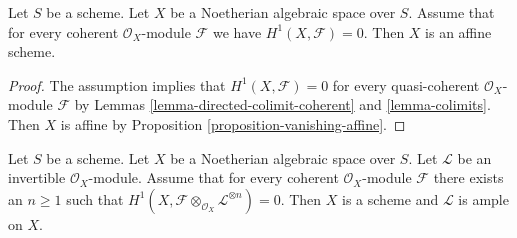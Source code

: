 \begin{lemma}
\label{lemma-Noetherian-h1-zero}
Let $S$ be a scheme. Let $X$ be a Noetherian algebraic space over $S$.
Assume that for every coherent $\mathcal{O}_X$-module
$\mathcal{F}$ we have $H^1(X, \mathcal{F}) = 0$.
Then $X$ is an affine scheme.
\end{lemma}

\begin{proof}
The assumption implies that $H^1(X, \mathcal{F}) = 0$ for every quasi-coherent
$\mathcal{O}_X$-module $\mathcal{F}$ by
Lemmas \ref{lemma-directed-colimit-coherent} and \ref{lemma-colimits}.
Then $X$ is affine by
Proposition \ref{proposition-vanishing-affine}.
\end{proof}

\begin{lemma}
\label{lemma-Noetherian-h1-zero-invertible}
Let $S$ be a scheme. Let $X$ be a Noetherian algebraic space over $S$.
Let $\mathcal{L}$ be an invertible $\mathcal{O}_X$-module.
Assume that for every coherent $\mathcal{O}_X$-module
$\mathcal{F}$ there exists an $n \geq 1$ such that
$H^1(X, \mathcal{F} \otimes_{\mathcal{O}_X} \mathcal{L}^{\otimes n}) = 0$.
Then $X$ is a scheme and $\mathcal{L}$ is ample on $X$.
\end{lemma}

